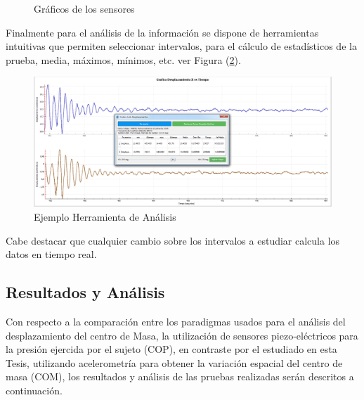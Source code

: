 \documentclass[12pt,a4paper]{article}
\begin{document}
\begin{figure}[H]
	\centering
	\caption{Gráficos de los sensores}
	\label{fig:Graficosensores}
\end{figure}


Finalmente para el análisis de la información se dispone de herramientas intuitivas que permiten seleccionar intervalos, para el cálculo de estadísticos de la prueba, media, máximos, mínimos, etc. ver Figura (\ref{fig:analsisGraficos}).

\begin{figure}[H]
	\centering
	\includegraphics[scale=0.3]{images/graficosyreportes/analisisGraficos}
	\caption{Ejemplo Herramienta de Análisis}
	\label{fig:analsisGraficos}
\end{figure}

Cabe destacar que cualquier cambio sobre los intervalos a estudiar calcula los datos en tiempo real.

\newpage
\subsection{Resultados y Análisis}
Con respecto a la comparación entre los paradigmas usados para el análisis del desplazamiento del centro de Masa, la utilización de sensores piezo-eléctricos para la presión ejercida por el sujeto (COP), en contraste por el estudiado en esta Tesis, utilizando acelerometría para obtener la variación espacial del centro de masa (COM), los resultados y análisis de las pruebas realizadas serán descritos a continuación.
\end{document}
